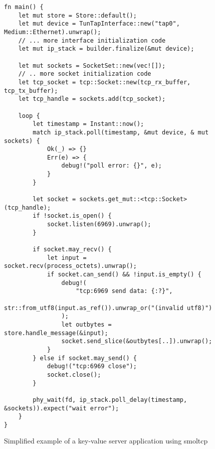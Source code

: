 \begin{figure}[H]
    \centering
    
\begin{verbatim}
fn main() {
    let mut store = Store::default();
    let mut device = TunTapInterface::new("tap0", Medium::Ethernet).unwrap();
    // ... more interface initialization code
    let mut ip_stack = builder.finalize(&mut device);

    let mut sockets = SocketSet::new(vec![]);
    // .. more socket initialization code
    let tcp_socket = tcp::Socket::new(tcp_rx_buffer, tcp_tx_buffer);
    let tcp_handle = sockets.add(tcp_socket);

    loop {
        let timestamp = Instant::now();
        match ip_stack.poll(timestamp, &mut device, & mut sockets) {
            Ok(_) => {}
            Err(e) => {
                debug!("poll error: {}", e);
            }
        }

        let socket = sockets.get_mut::<tcp::Socket>(tcp_handle);
        if !socket.is_open() {
            socket.listen(6969).unwrap();
        }

        if socket.may_recv() {
            let input = socket.recv(process_octets).unwrap();
            if socket.can_send() && !input.is_empty() {
                debug!(
                    "tcp:6969 send data: {:?}",
                    str::from_utf8(input.as_ref()).unwrap_or("(invalid utf8)")
                );
                let outbytes = store.handle_message(&input);
                socket.send_slice(&outbytes[..]).unwrap();
            }
        } else if socket.may_send() {
            debug!("tcp:6969 close");
            socket.close();
        }

        phy_wait(fd, ip_stack.poll_delay(timestamp, &sockets)).expect("wait error");
    }
}
\end{verbatim}
    \caption{Simplified example of a key-value server application using smoltcp}
    \label{fig:oldTopLevel}
\end{figure}


